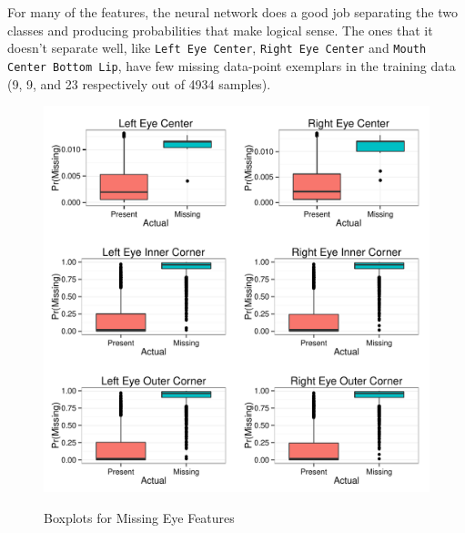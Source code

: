 \documentclass[journal]{IEEEtran}
\begin{document}
For many of the features, the neural network does a good job separating the two classes and producing probabilities that make logical sense.  The ones that it doesn't separate well, like \texttt{Left Eye Center}, \texttt{Right Eye Center} and \texttt{Mouth Center Bottom Lip}, have few missing data-point exemplars in the training data (9, 9, and 23 respectively out of 4934 samples).

\begin{figure}[!ht]
  \centering
  \caption{Boxplots for Missing Eye Features}
  \includegraphics[scale=.5]{logistic_boxplots_eye.pdf}
  \label{fig:logistic_boxplots_eye}
\end{figure}
\end{document}

